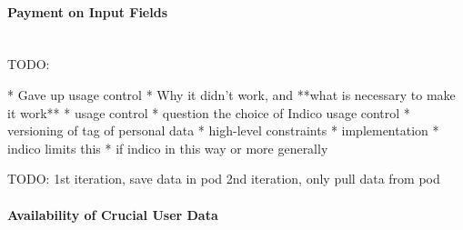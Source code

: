 \paragraph{Payment on Input Fields}\mbox{}\\

TODO:


* Gave up usage control
  * Why it didn't work, and **what is necessary to make it work**
    * usage control
    * question the choice of Indico usage control
    * versioning of tag of personal data
* high-level constraints
* implementation
  * indico limits this
* if indico in this way or more generally

TODO:
1st iteration, save data in pod
2nd iteration, only pull data from pod

\vspace{0.5cm}
\paragraph{Availability of Crucial User Data}\mbox{}\\
